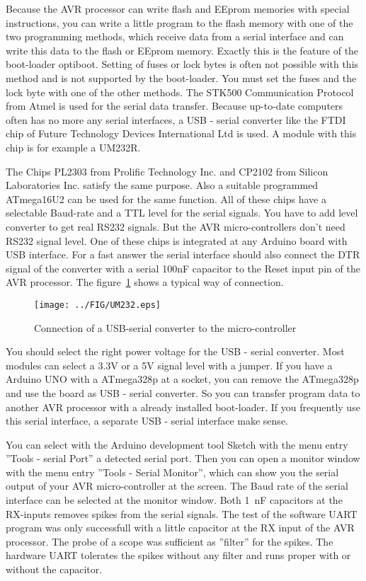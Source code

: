 Because the AVR processor can write flash and EEprom memories with special instructions,
you can write a little program to the flash memory with one of the two programming methods,
which receive data from a serial interface and can write this data to
the flash or EEprom memory.
Exactly this is the feature of the boot-loader optiboot.
Setting of fuses or lock bytes is often not possible with this method and
is not supported by the boot-loader.
You must set the fuses and the lock byte with one of the other methods.
The STK500 Communication Protocol from Atmel is used for the serial data transfer.
Because up-to-date computers often has no more any serial interfaces, 
a USB - serial converter like the FTDI chip of Future Technology Devices International Ltd
is used. A module with this chip is for example a UM232R.

The Chips PL2303 from Prolific Technology Inc. and CP2102 from Silicon Laboratories Inc. 
satisfy the same purpose.
Also a suitable programmed ATmega16U2 can be used for the same function.
All of these chips have a selectable Baud-rate and a TTL level for the serial signals.
You have to add level converter to get real RS232 signals.
But the AVR micro-controllers don't need RS232 signal level.
One of these chips is integrated at any Arduino board with USB interface.
For a fast answer the serial interface should also connect the DTR signal of
the converter with a serial 100nF capacitor to the Reset input pin of
the AVR processor. The figure~\ref{fig:UM232} shows a  typical way of connection.

\begin{figure}[H]
\centering
\texttt{[image: ../FIG/UM232.eps]}
\caption{Connection of a USB-serial converter to the micro-controller}
\label{fig:UM232}
\end{figure}

You should select the right power voltage for the USB - serial converter.
Most modules can select a 3.3V or a 5V signal level with a jumper.
If you have a Arduino UNO with a ATmega328p at a socket, you can remove the
ATmega328p and use the board as USB - serial converter.
So you can transfer program data to another AVR processor with a already
installed boot-loader. If you frequently use this serial interface,
a separate USB - serial interface make sense.

You can select with the Arduino development tool Sketch with the menu entry ''Tools - serial Port''
a detected serial port. Then you can open a monitor window with the menu entry ''Tools - Serial Monitor'',
which can show you the serial output of your AVR micro-controller at the screen.
The Baud rate of the serial interface can be selected at the monitor window.
Both 1~nF capacitors at the RX-inputs removes spikes from the serial signals.
The test of the software UART program was only successfull with a little capacitor
at the RX input of the AVR processor. The probe of a scope was sufficient as ''filter'' for the spikes.
The hardware UART tolerates the spikes without any filter and runs proper
with or without the capacitor. 

